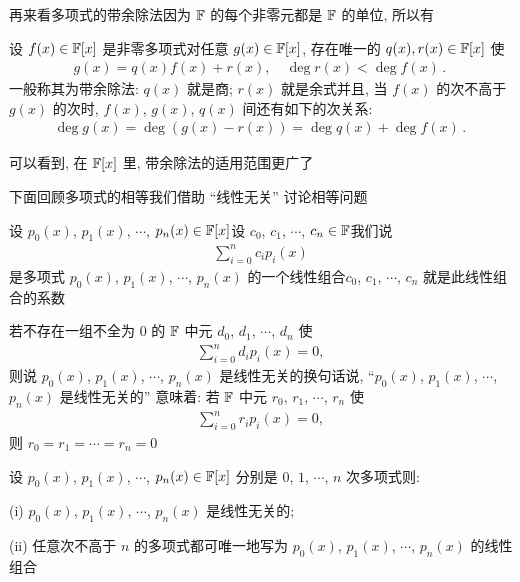 再来看多项式的带余除法\period 因为 $\mathbb{F}$ 的每个非零元都是 $\mathbb{F}$ 的单位, 所以有

\begin{proposition}
    设 $f(x) \in \mathbb{F}[x]$ 是非零多项式\period 对任意 $g(x) \in \mathbb{F}[x]$, 存在唯一的 $q(x), r(x) \in \mathbb{F}[x]$ 使
    \begin{align*}
        g(x) = q(x) f(x) + r(x), \quad \deg r(x) < \deg f(x) \period
    \end{align*}
    一般称其为带余除法: $q(x)$ 就是商; $r(x)$ 就是余式\period 并且, 当 $f(x)$ 的次不高于 $g(x)$ 的次时, $f(x)$, $g(x)$, $q(x)$ 间还有如下的次关系:
    \begin{align*}
        \deg g(x) = \deg (g(x) - r(x)) = \deg q(x) + \deg f(x) \period
    \end{align*}
\end{proposition}

可以看到, 在 $\mathbb{F}[x]$ 里, 带余除法的适用范围更广了\period

下面回顾多项式的相等\period 我们借助 ``线性无关'' 讨论相等问题\period

\begin{definition}
    设 $p_0 (x)$, $p_1 (x)$, $\cdots$, $p_n (x) \in \mathbb{F}[x]$\period 设 $c_0$, $c_1$, $\cdots$, $c_n \in \mathbb{F}$\period 我们说
    \begin{align*}
        \sum_{i = 0}^{n} c_i p_i (x)
    \end{align*}
    是多项式 $p_0 (x)$, $p_1 (x)$, $\cdots$, $p_n (x)$ 的一个线性组合\period $c_0$, $c_1$, $\cdots$, $c_n$ 就是此线性组合的系数\period

    若不存在一组不全为 $0$ 的 $\mathbb{F}$ 中元 $d_0$, $d_1$, $\cdots$, $d_n$ 使
    \begin{align*}
        \sum_{i = 0}^{n} d_i p_i (x) = 0,
    \end{align*}
    则说 $p_0 (x)$, $p_1 (x)$, $\cdots$, $p_n (x)$ 是线性无关的\period 换句话说, ``$p_0 (x)$, $p_1 (x)$, $\cdots$, $p_n (x)$ 是线性无关的'' 意味着: 若 $\mathbb{F}$ 中元 $r_0$, $r_1$, $\cdots$, $r_n$ 使
    \begin{align*}
        \sum_{i = 0}^{n} r_i p_i (x) = 0,
    \end{align*}
    则 $r_0 = r_1 = \cdots = r_n = 0$\period
\end{definition}

\begin{proposition}
    设 $p_0 (x)$, $p_1 (x)$, $\cdots$, $p_n (x) \in \mathbb{F}[x]$ 分别是 $0$, $1$, $\cdots$, $n$ 次多项式\period 则:

    (i) $p_0 (x)$, $p_1 (x)$, $\cdots$, $p_n (x)$ 是线性无关的;

    (ii) 任意次不高于 $n$ 的多项式都可唯一地写为 $p_0 (x)$, $p_1 (x)$, $\cdots$, $p_n (x)$ 的线性组合\period
\end{proposition}

